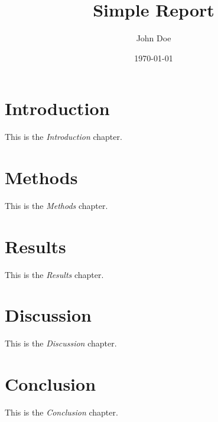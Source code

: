 \documentclass[a4paper]{report}
\title{Simple Report}
\author{John Doe}
\date{\today}
\begin{document}
    \maketitle
    \tableofcontents
        \chapter{Introduction}
        This is the \textit{Introduction} chapter.
        
        \chapter{Methods}
        This is the \textit{Methods} chapter.
        
        \chapter{Results}
        This is the \textit{Results} chapter.
        
        \chapter{Discussion}
        This is the \textit{Discussion} chapter.
        
        \chapter{Conclusion}
        This is the \textit{Conclusion} chapter.
\end{document}
